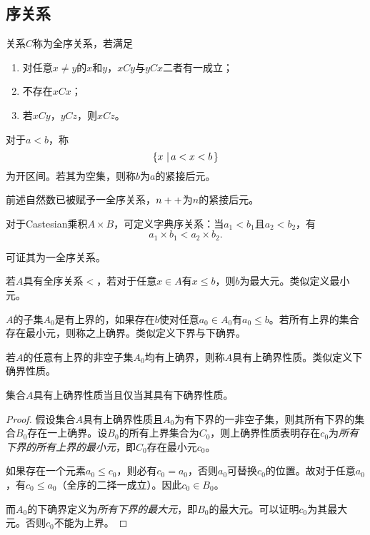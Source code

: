 \documentclass{ctexrep}
\begin{document}
  \subsection{序关系}
  \begin{definition}
    关系$C$称为全序关系，若满足
    \begin{enumerate}
      \item 对任意$x\ne y$的$x$和$y$，$xCy$与$yCx$二者有一成立；
      \item 不存在$xCx$；
      \item 若$xCy$，$yCz$，则$xCz$。
    \end{enumerate}
  \end{definition}
  \begin{definition}
    对于$a<b$，称
    \[ \left\{x \, \left| \, a<x<b \right.\right\} \]
    为开区间。若其为空集，则称$b$为$a$的紧接后元。
  \end{definition}
  前述自然数已被赋予一全序关系，$n++$为$n$的紧接后元。
  \begin{definition}
    对于Castesian乘积$A\times B$，可定义字典序关系：当$a_1<b_1$且$a_2<b_2$，有
    \[ a_1\times b_1 < a_2 \times b_2. \]
  \end{definition}
  可证其为一全序关系。
  \begin{definition}
    若$A$具有全序关系$<$，若对于任意$x\in A$有$x\le b$，则$b$为最大元。类似定义最小元。
  \end{definition}
  \begin{definition}
    $A$的子集$A_0$是有上界的，如果存在$b$使对任意$a_0\in A_0$有$a_0\le b$。若所有上界的集合存在最小元，则称之上确界。类似定义下界与下确界。
  \end{definition}
  \begin{definition}
    若$A$的任意有上界的非空子集$A_0$均有上确界，则称$A$具有上确界性质。类似定义下确界性质。
  \end{definition}
  \begin{theorem}
    集合$A$具有上确界性质当且仅当其具有下确界性质。
  \end{theorem}
  \begin{proof}
	  假设集合$A$具有上确界性质且$A_0$为有下界的一非空子集，则其所有下界的集合$B_0$存在一上确界。设$B_0$的所有上界集合为$C_0$，则上确界性质表明存在$c_0$为\emph{所有下界的所有上界的最小元}，即$C_0$存在最小元$c_0$。
	  \par
	  如果存在一个元素$a_0\le c_0$，则必有$c_0=a_0$，否则$a_0$可替换$c_0$的位置。故对于任意$a_0$，有$c_0\le a_0$（全序的二择一成立）。因此$c_0\in B_0$。
	  \par
	  而$A_0$的下确界定义为\emph{所有下界的最大元}，即$B_0$的最大元。可以证明$c_0$为其最大元。否则$c_0$不能为上界。
  \end{proof}
\end{document}
